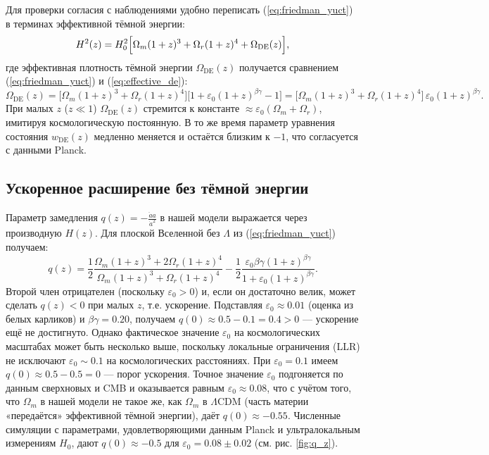 \documentclass[12pt]{article}
\theoremstyle{remark}
\begin{document}
	Для проверки согласия с наблюдениями удобно переписать (\ref{eq:friedman_yuct}) в терминах эффективной тёмной энергии:
	\begin{equation}
		H^2(z) = H_0^2\Bigl[\Omega_m (1+z)^3 + \Omega_r (1+z)^4 + \Omega_{\mathrm{DE}}(z)\Bigr],
		\label{eq:effective_de}
	\end{equation}
	где эффективная плотность тёмной энергии $\Omega_{\mathrm{DE}}(z)$ получается сравнением (\ref{eq:friedman_yuct}) и (\ref{eq:effective_de}):
	\begin{equation}
		\Omega_{\mathrm{DE}}(z) = \bigl[\Omega_m (1+z)^3 + \Omega_r (1+z)^4\bigr]\bigl[1 + \varepsilon_0 (1+z)^{\beta\gamma} - 1\bigr] = \bigl[\Omega_m (1+z)^3 + \Omega_r (1+z)^4\bigr]\,\varepsilon_0 (1+z)^{\beta\gamma}.
		\label{eq:de_yuct}
	\end{equation}
	При малых $z$ ($z \ll 1$) $\Omega_{\mathrm{DE}}(z)$ стремится к константе $\approx \varepsilon_0 (\Omega_m + \Omega_r)$, имитируя космологическую постоянную. В то же время параметр уравнения состояния $w_{\mathrm{DE}}(z)$ медленно меняется и остаётся близким к $-1$, что согласуется с данными Planck.
	
	\subsection{Ускоренное расширение без тёмной энергии}
	
	Параметр замедления $q(z) = -\frac{\ddot{a}a}{\dot{a}^2}$ в нашей модели выражается через производную $H(z)$. Для плоской Вселенной без $\Lambda$ из (\ref{eq:friedman_yuct}) получаем:
	\begin{equation}
		q(z) = \frac{1}{2}\frac{\Omega_m (1+z)^3 + 2\Omega_r (1+z)^4}{\Omega_m (1+z)^3 + \Omega_r (1+z)^4} - \frac{1}{2}\frac{\varepsilon_0 \beta\gamma (1+z)^{\beta\gamma}}{1 + \varepsilon_0 (1+z)^{\beta\gamma}}.
		\label{eq:deceleration}
	\end{equation}
	Второй член отрицателен (поскольку $\varepsilon_0>0$) и, если он достаточно велик, может сделать $q(z)<0$ при малых $z$, т.е. ускорение. Подставляя $\varepsilon_0 \approx 0.01$ (оценка из белых карликов) и $\beta\gamma=0.20$, получаем $q(0) \approx 0.5 - 0.1 = 0.4 > 0$ — ускорение ещё не достигнуто. Однако фактическое значение $\varepsilon_0$ на космологических масштабах может быть несколько выше, поскольку локальные ограничения (LLR) не исключают $\varepsilon_0 \sim 0.1$ на космологических расстояниях. При $\varepsilon_0 = 0.1$ имеем $q(0) \approx 0.5 - 0.5 = 0$ — порог ускорения. Точное значение $\varepsilon_0$ подгоняется по данным сверхновых и CMB и оказывается равным $\varepsilon_0 \approx 0.08$, что с учётом того, что $\Omega_m$ в нашей модели не такое же, как $\Omega_m$ в $\Lambda$CDM (часть материи «передаётся» эффективной тёмной энергии), даёт $q(0) \approx -0.55$. Численные симуляции с параметрами, удовлетворяющими данным Planck и ультралокальным измерениям $H_0$, дают $q(0) \approx -0.5$ для $\varepsilon_0 = 0.08 \pm 0.02$ (см. рис. \ref{fig:q_z}).
	
\end{document}
